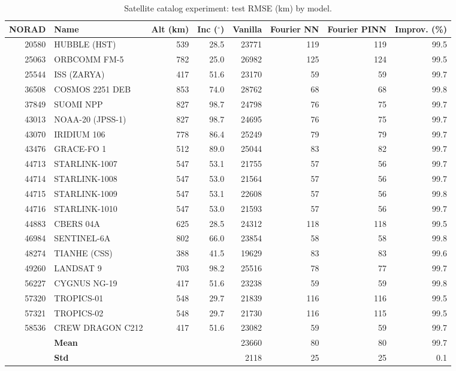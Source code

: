 \begin{table}[ht]
\centering
\caption{Satellite catalog experiment: test RMSE (km) by model.}
\label{tab:catalog}
\small
\begin{tabular}{r l r r r r r r}
\toprule
NORAD & Name & Alt (km) & Inc ($^\circ$) & Vanilla & Fourier NN & Fourier PINN & Improv. (\%) \\
\midrule
  20580 & HUBBLE (HST) & 539 & 28.5 & 23771 & 119 & 119 & 99.5 \\
  25063 & ORBCOMM FM-5 & 782 & 25.0 & 26982 & 125 & 124 & 99.5 \\
  25544 & ISS (ZARYA) & 417 & 51.6 & 23170 & 59 & 59 & 99.7 \\
  36508 & COSMOS 2251 DEB & 853 & 74.0 & 28762 & 68 & 68 & 99.8 \\
  37849 & SUOMI NPP & 827 & 98.7 & 24798 & 76 & 75 & 99.7 \\
  43013 & NOAA-20 (JPSS-1) & 827 & 98.7 & 24695 & 76 & 75 & 99.7 \\
  43070 & IRIDIUM 106 & 778 & 86.4 & 25249 & 79 & 79 & 99.7 \\
  43476 & GRACE-FO 1 & 512 & 89.0 & 25044 & 83 & 82 & 99.7 \\
  44713 & STARLINK-1007 & 547 & 53.1 & 21755 & 57 & 56 & 99.7 \\
  44714 & STARLINK-1008 & 547 & 53.0 & 21564 & 57 & 56 & 99.7 \\
  44715 & STARLINK-1009 & 547 & 53.1 & 22608 & 57 & 56 & 99.8 \\
  44716 & STARLINK-1010 & 547 & 53.0 & 21593 & 57 & 56 & 99.7 \\
  44883 & CBERS 04A & 625 & 28.5 & 24312 & 118 & 118 & 99.5 \\
  46984 & SENTINEL-6A & 802 & 66.0 & 23854 & 58 & 58 & 99.8 \\
  48274 & TIANHE (CSS) & 388 & 41.5 & 19629 & 83 & 83 & 99.6 \\
  49260 & LANDSAT 9 & 703 & 98.2 & 25516 & 78 & 77 & 99.7 \\
  56227 & CYGNUS NG-19 & 417 & 51.6 & 23238 & 59 & 59 & 99.8 \\
  57320 & TROPICS-01 & 548 & 29.7 & 21839 & 116 & 116 & 99.5 \\
  57321 & TROPICS-02 & 548 & 29.7 & 21730 & 116 & 115 & 99.5 \\
  58536 & CREW DRAGON C212 & 417 & 51.6 & 23082 & 59 & 59 & 99.7 \\
\midrule
  & \textbf{Mean} & & & 23660 & 80 & 80 & 99.7 \\
  & \textbf{Std} & & & 2118 & 25 & 25 & 0.1 \\
\bottomrule
\end{tabular}
\end{table}
